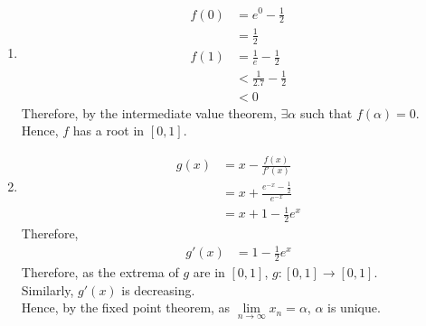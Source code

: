 \documentclass[fleqn, a4paper, 12pt, twoside]{article}
\theoremstyle{definition}
\theoremstyle{theorem}
\begin{document}
\begin{solution}
	\begin{enumerate}[leftmargin=*]
		\item
			\begin{align*}
				f(0) & = e^0 - \frac{1}{2}           \\
                                     & = \frac{1}{2}                 \\
				f(1) & = \frac{1}{e} - \frac{1}{2}   \\
                                     & < \frac{1}{2.7} - \frac{1}{2} \\
                                     & < 0
			\end{align*}
			Therefore, by the intermediate value theorem, $\exists \alpha$ such that $f(\alpha) = 0$.
			Hence, $f$ has a root in $[0,1]$.
		\item
			\begin{align*}
				g(x) & = x - \frac{f(x)}{f'(x)}                  \\
                                     & = x + \frac{e^{-x} - \frac{1}{2}}{e^{-x}} \\
                                     & = x + 1 - \frac{1}{2} e^x
			\end{align*}
			Therefore,
			\begin{align*}
				g'(x) & = 1 - \frac{1}{2} e^x
			\end{align*}
			Therefore, as the extrema of $g$ are in $[0,1]$, $g : [0,1] \to [0,1]$.\\
			Similarly, $g'(x)$ is decreasing.\\
			Hence, by the fixed point theorem, as $\lim\limits_{n \to \infty} x_n = \alpha$, $\alpha$ is unique.
	\end{enumerate}
\end{solution}
\end{document}
